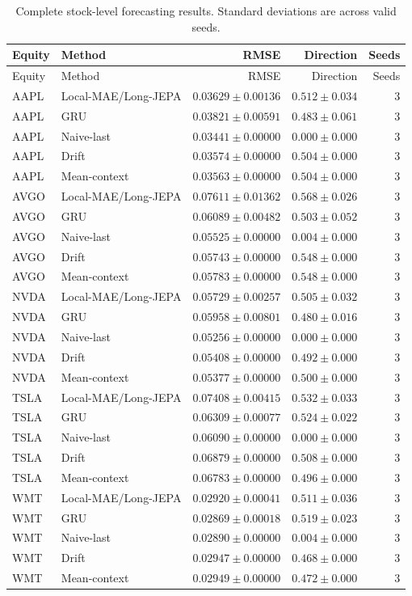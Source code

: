 \begin{longtable}{llrrr}
\caption{Complete stock-level forecasting results. Standard deviations are across valid seeds.}\label{tab:appendix_stock_metrics}\\
\toprule
Equity & Method & RMSE & Direction & Seeds \\
\midrule
\endfirsthead
\toprule
Equity & Method & RMSE & Direction & Seeds \\
\midrule
\endhead
AAPL & Local-MAE/Long-JEPA & $0.03629 \pm 0.00136$ & $0.512 \pm 0.034$ & 3 \\
AAPL & GRU & $0.03821 \pm 0.00591$ & $0.483 \pm 0.061$ & 3 \\
AAPL & Naive-last & $0.03441 \pm 0.00000$ & $0.000 \pm 0.000$ & 3 \\
AAPL & Drift & $0.03574 \pm 0.00000$ & $0.504 \pm 0.000$ & 3 \\
AAPL & Mean-context & $0.03563 \pm 0.00000$ & $0.504 \pm 0.000$ & 3 \\
AVGO & Local-MAE/Long-JEPA & $0.07611 \pm 0.01362$ & $0.568 \pm 0.026$ & 3 \\
AVGO & GRU & $0.06089 \pm 0.00482$ & $0.503 \pm 0.052$ & 3 \\
AVGO & Naive-last & $0.05525 \pm 0.00000$ & $0.004 \pm 0.000$ & 3 \\
AVGO & Drift & $0.05743 \pm 0.00000$ & $0.548 \pm 0.000$ & 3 \\
AVGO & Mean-context & $0.05783 \pm 0.00000$ & $0.548 \pm 0.000$ & 3 \\
NVDA & Local-MAE/Long-JEPA & $0.05729 \pm 0.00257$ & $0.505 \pm 0.032$ & 3 \\
NVDA & GRU & $0.05958 \pm 0.00801$ & $0.480 \pm 0.016$ & 3 \\
NVDA & Naive-last & $0.05256 \pm 0.00000$ & $0.000 \pm 0.000$ & 3 \\
NVDA & Drift & $0.05408 \pm 0.00000$ & $0.492 \pm 0.000$ & 3 \\
NVDA & Mean-context & $0.05377 \pm 0.00000$ & $0.500 \pm 0.000$ & 3 \\
TSLA & Local-MAE/Long-JEPA & $0.07408 \pm 0.00415$ & $0.532 \pm 0.033$ & 3 \\
TSLA & GRU & $0.06309 \pm 0.00077$ & $0.524 \pm 0.022$ & 3 \\
TSLA & Naive-last & $0.06090 \pm 0.00000$ & $0.000 \pm 0.000$ & 3 \\
TSLA & Drift & $0.06879 \pm 0.00000$ & $0.508 \pm 0.000$ & 3 \\
TSLA & Mean-context & $0.06783 \pm 0.00000$ & $0.496 \pm 0.000$ & 3 \\
WMT & Local-MAE/Long-JEPA & $0.02920 \pm 0.00041$ & $0.511 \pm 0.036$ & 3 \\
WMT & GRU & $0.02869 \pm 0.00018$ & $0.519 \pm 0.023$ & 3 \\
WMT & Naive-last & $0.02890 \pm 0.00000$ & $0.004 \pm 0.000$ & 3 \\
WMT & Drift & $0.02947 \pm 0.00000$ & $0.468 \pm 0.000$ & 3 \\
WMT & Mean-context & $0.02949 \pm 0.00000$ & $0.472 \pm 0.000$ & 3 \\
\bottomrule
\end{longtable}
